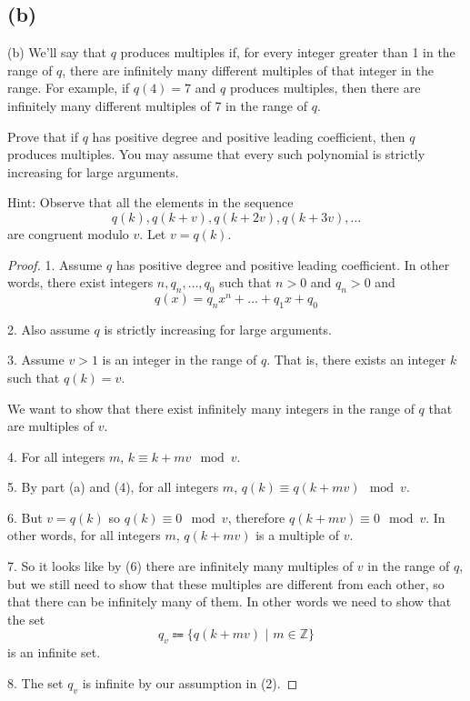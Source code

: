 \documentclass[14pt]{extarticle}
\begin{document}
\subsection{(b)}
(b) We’ll say that $q$ produces multiples if, for every integer greater than 1 in the range of $q$, there are infinitely many different multiples of that integer in the range. For example, if $q(4) = 7$ and $q$ produces multiples, then there are infinitely many different multiples of 7 in the range of $q$.

Prove that if $q$ has positive degree and positive leading coefficient, then $q$ produces multiples. You may assume that every such polynomial is strictly increasing for large arguments.

Hint: Observe that all the elements in the sequence
$$
q(k), q(k + v), q(k + 2v), q(k + 3v), \ldots
$$
are congruent modulo $v$. Let $v = q(k)$.
\begin{proof}
1. Assume $q$ has positive degree and positive leading coefficient. In other words, there exist integers $n, q_n, \ldots, q_0$ such that $n > 0$ and $q_n > 0$ and
$$
q(x) = q_nx^n + \ldots + q_1x + q_0
$$

2. Also assume $q$ is strictly increasing for large arguments.

3. Assume $v > 1$ is an integer in the range of $q$. That is, there exists an integer $k$ such that $q(k) = v$.

We want to show that there exist infinitely many integers in the range of $q$ that are multiples of $v$.

4. For all integers $m$, $k \equiv k + mv \mod v$.

5. By part (a) and (4), for all integers $m$, $q(k) \equiv q(k + mv) \mod v$. 

6. But $v = q(k)$ so $q(k) \equiv 0 \mod v$, therefore $q(k + mv) \equiv 0 \mod v$. In other words, for all integers $m$, $q(k+mv)$ is a multiple of $v$.

7. So it looks like by (6) there are infinitely many multiples of $v$ in the range of $q$, but we still need to show that these multiples are different from each other, so that there can be infinitely many of them. In other words we need to show that the set
$$
q_v \Coloneqq \{q(k + mv)\,\,|\,\,m \in \mathbb{Z}\}
$$
is an infinite set.

8. The set $q_v$ is infinite by our assumption in (2).
\end{proof}
\end{document}

